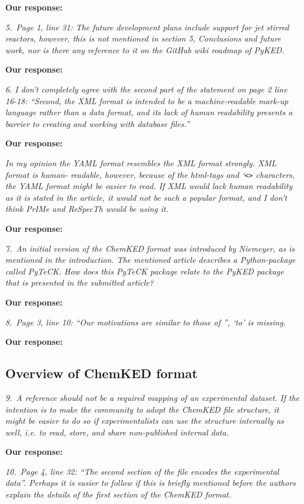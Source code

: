 \documentclass[a4paper,10pt]{elsarticle}
\begin{document}
\textbf{Our response:}


\textit{5.~Page 1, line 31: The future development plans include support for jet stirred reactors, however, this is not mentioned in section 5, Conclusions and future work, nor is there any reference to it on the GitHub wiki roadmap of PyKED.}

\textbf{Our response:}

\textit{6. I don't completely agree with the second part of the statement on page 2 line 16-18: ``Second, the XML format is intended to be a machine-readable mark-up language rather than a data format, and its lack of human readability presents a barrier to creating and working with database files.''}

\textbf{Our response:}

\textit{In my opinion the YAML format resembles the XML format strongly. XML format is human- readable, however, because of the html-tags and `\texttt{<>} characters, the YAML format might be easier to read. If XML would lack human readability as it is stated in the article, it would not be such a popular format, and I don't think PrIMe and ReSpecTh would be using it.}

\textbf{Our response:}

\textit{7.~An initial version of the ChemKED format was introduced by Niemeyer, as is mentioned in the introduction. The mentioned article describes a Python-package called PyTeCK. How does this PyTeCK package relate to the PyKED package that is presented in the submitted article?}

\textbf{Our response:}


\textit{8.~Page 3, line 10: ``Our motivations are similar to those of '', `to' is missing.}

\textbf{Our response:}


\subsection*{Overview of ChemKED format}

\textit{9.~A reference should not be a required mapping of an experimental dataset. If the intention is to make the community to adopt the ChemKED file structure, it might be easier to do so if experimentalists can use the structure internally as well, i.e. to read, store, and share non-published internal data.}

\textbf{Our response:}

\textit{10.~Page 4, line 32: ``The second section of the file encodes the experimental data''. Perhaps it is easier to follow if this is briefly mentioned before the authors explain the details of the first section of the ChemKED format.}
\end{document}
